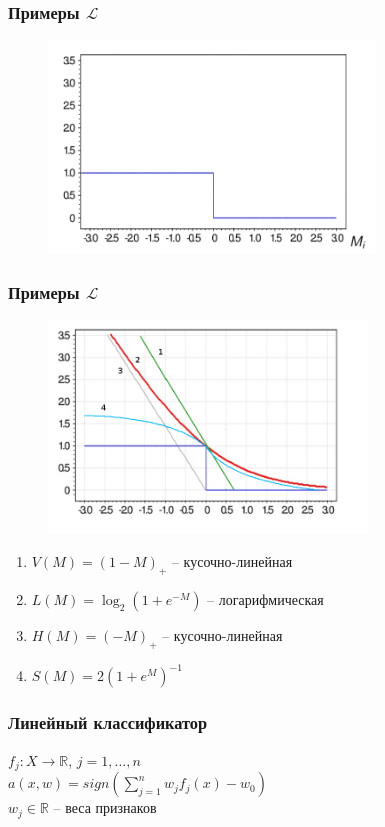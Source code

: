 \documentclass[12pt]{beamer}
\begin{document}
\begin{frame}\frametitle{Примеры $\mathcal{L}$}
\begin{figure}[htbp]
  \includegraphics[height=160pt, keepaspectratio = true]{images/l1}   
\end{figure}
\end{frame}

\begin{frame}\frametitle{Примеры $\mathcal{L}$}
\begin{figure}[htbp]
  \includegraphics[height=160pt, keepaspectratio = true]{images/l}   
\end{figure}
\begin{enumerate}
\item $V(M) = (1-M)_+$ -- кусочно-линейная
\item $L(M) = \log_2(1+e^{-M})$ -- логарифмическая
\item $H(M) = (-M)_+$ -- кусочно-линейная
\item $S(M) = 2(1+e^M)^{-1}$
\end{enumerate}
\end{frame}

\begin{frame}\frametitle{Линейный классификатор}
$f_j: X \rightarrow \mathbb{R}$, $j = 1,\dots, n$\\
\vspace{3mm}
$a(x, w) = sign(\sum_{j=1}^n w_jf_j(x) - w_0)$\\
\vspace{3mm}
$w_j \in \mathbb{R}$ -- веса признаков\\
\end{frame}
\end{document}
